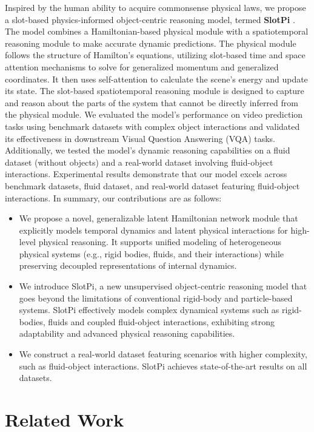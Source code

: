\documentclass[sigconf]{acmart}
\begin{document}
Inspired by the human ability to acquire commonsense physical laws, we propose a slot-based physics-informed object-centric reasoning model, termed \textbf{SlotPi} . The model combines a Hamiltonian-based physical module with a spatiotemporal reasoning module to make accurate dynamic predictions. The physical module follows the structure of Hamilton's equations, utilizing slot-based time and space attention mechanisms to solve for generalized momentum and generalized coordinates. It then uses self-attention to calculate the scene’s energy and update its state. The slot-based spatiotemporal reasoning module is designed to capture and reason about the parts of the system that cannot be directly inferred from the physical module. We evaluated the model’s performance on video prediction tasks using benchmark datasets with complex object interactions and validated its effectiveness in downstream Visual Question Answering (VQA) tasks. Additionally, we tested the model’s dynamic reasoning capabilities on a fluid dataset (without objects) and a real-world dataset involving fluid-object interactions. Experimental results demonstrate that our model excels across benchmark datasets, fluid dataset, and real-world dataset featuring fluid-object interactions. In summary, our contributions are as follows:
\begin{itemize}
\item We propose a novel, generalizable latent Hamiltonian network module that explicitly models temporal dynamics and latent physical interactions for high-level physical reasoning. It supports unified modeling of heterogeneous physical systems (e.g., rigid bodies, fluids, and their interactions) while preserving decoupled representations of internal dynamics.
\item We introduce SlotPi, a new unsupervised object-centric reasoning model that goes beyond the limitations of conventional rigid-body and particle-based systems. SlotPi effectively models complex dynamical systems such as rigid-bodies, fluids and coupled fluid-object interactions, exhibiting strong adaptability and advanced physical reasoning capabilities.
\item We construct a real-world dataset featuring scenarios with higher complexity, such as fluid-object interactions. SlotPi achieves state-of-the-art results on all datasets.
\end{itemize}


\section{Related Work}
\end{document}
